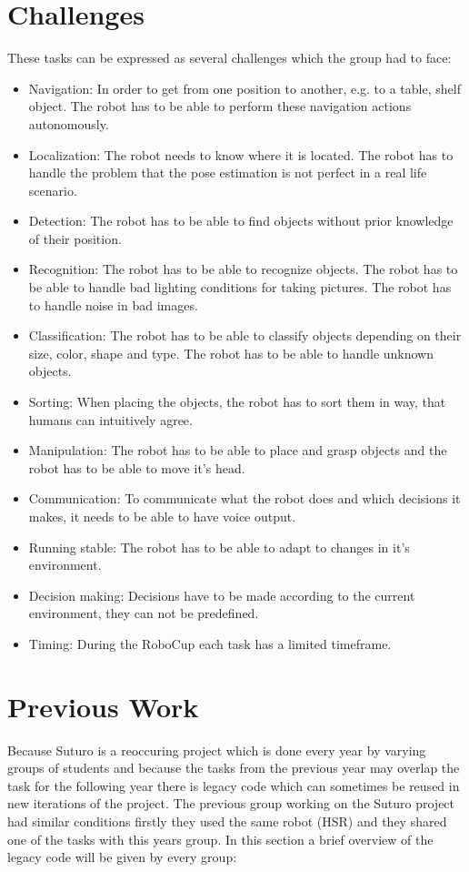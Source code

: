 \documentclass[main.tex]{subfiles}
\begin{document}
	\section{Challenges}
	\label{challanges}
	These tasks can be expressed as several challenges which the group had to face:
	\begin{itemize}
		\item Navigation: In order to get from one position to another, e.g. to a table, shelf object. The robot has to be able to perform these navigation actions autonomously.
		\item Localization: The robot needs to know where it is located. The robot has to handle the problem that the pose estimation is not perfect in a real life scenario.
		\item Detection: The robot has to be able to find objects without prior knowledge of their position.
		\item Recognition: The robot has to be able to recognize objects. The robot has to be able to handle bad lighting conditions for taking pictures. The robot has to handle noise in bad images.
		\item Classification: The robot has to be able to classify objects depending on their size, color, shape and type. The robot has to be able to handle unknown objects.
		\item Sorting: When placing the objects, the robot has to sort them in way, that humans can intuitively agree.
		\item Manipulation: The robot has to be able to place and grasp objects and the robot has to be able to move it's head.
		\item Communication: To communicate what the robot does and which decisions it makes, it needs to be able to have voice output.
		\item Running stable: The robot has to be able to adapt to changes in it's environment.
		\item Decision making: Decisions have to be made according to the current environment, they can not be predefined. 
		\item Timing: During the RoboCup each task has a limited timeframe.
	\end{itemize}

	\section{Previous Work}
		Because Suturo is a reoccuring project which is done every year by varying groups of students and because the tasks from the previous year may overlap the task for the following year there is legacy code which can sometimes be reused in new iterations of the project. The previous group working on the Suturo project had similar conditions firstly they used the same robot (HSR) and they shared one of the tasks with this years group. In this section a brief overview of the legacy code will be given by every group:
\end{document}
